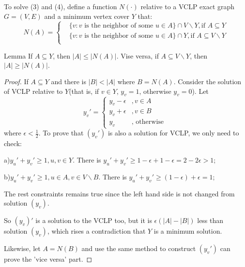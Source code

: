     To solve (3) and (4), define a function $N(\cdot)$ relative to 
    a VCLP exact graph $G=(V,E)$ and a minimum vertex cover $Y$ that: 
    \begin{equation*}
        N(A)=\begin{cases}
                &\{v:v\text{ is the neighbor of some }u\in A\}\cap V\backslash Y, \text{if }A\subseteq Y\\
                &\{v:v\text{ is the neighbor of some }u\in A\}\cap Y, \text{if }A\subseteq V\backslash Y\\
            \end{cases}
    \end{equation*}
    \begin{thm}{Lemma}{}
        If $A\subseteq Y$, then $|A|\leq |N(A)|$. Vise versa, 
        if $A\subseteq V\backslash Y$, then $|A|\geq |N(A)|$. 
    \end{thm}
    \begin{proof}
        If $A\subseteq Y$ and there is $|B|<|A|$ where $B=N(A)$. 
        Consider the solution of VCLP relative to $Y$(that is, if $v\in Y$, $y_v=1$, otherwise $y_v=0$). Let 
        \begin{equation*}
            y_v'=
            \begin{cases}
                y_v-\epsilon&,v\in A\\
                y_v+\epsilon&,v\in B\\
                y_v &,\text{ otherwise }
            \end{cases}
        \end{equation*}
        where $\epsilon < \frac{1}{2}$. To prove that $(y_v')$ is also a solution for VCLP, we only need to check: 

        a)$y_u'+y_v'\geq 1,u,v\in Y$. There is $y_u'+y_v'\geq 1-\epsilon+1-\epsilon=2-2\epsilon>1$; 

        b)$y_u'+y_v'\geq 1,u\in A,v\in V\backslash B$. There is $y_u'+y_v'\geq (1-\epsilon) + \epsilon=1$; 

        The rest constraints remains true since the left hand side is not changed from solution $(y_v)$. 

        So $(y_v)'$ is a solution to the VCLP too, but it is $\epsilon(|A|-|B|)$ less than solution $(y_v)$, which rises a contradiction that $Y$ is a minimum solution. 
        
        Likewise, let $A=N(B)$ and use the same method to construct $(y_v')$ can prove the 'vice versa' part. 
    \end{proof}

